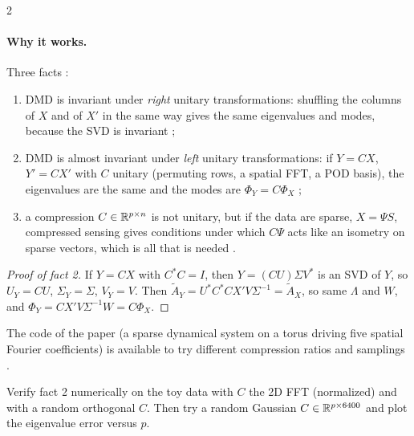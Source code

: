 \begin{paracol}{2}
\paragraph{Why it works.} Three facts :
\begin{enumerate}
  \item DMD is invariant under \emph{right} unitary transformations: shuffling the columns of $X$ and of
        $X'$ in the same way gives the same eigenvalues and modes, because the SVD is invariant
        ;
  \item DMD is almost invariant under \emph{left} unitary transformations: if $Y=CX$, $Y'=CX'$ with $C$
        unitary (permuting rows, a spatial FFT, a POD basis), the eigenvalues are the same and the modes are
        $\Phi_Y=C\Phi_X$ ;
  \item a compression $C\in\mathbb{R}^{p\times n}$ is not unitary, but if the data are sparse, $X=\Psi S$, compressed
        sensing gives conditions under which $C\Psi$ acts like an isometry on sparse vectors, which is
        all that is needed .
\end{enumerate}

\begin{proof}[Proof of fact 2]
If $Y=CX$ with $C^*C=I$, then $Y=(CU)\Sigma V^*$ is an SVD of $Y$, so $U_Y=CU$, $\Sigma_Y=\Sigma$, $V_Y=V$.
Then $\tilde A_Y=U^*C^*CX'V\Sigma^{-1}=\tilde A_X$, so same $\Lambda$ and $W$, and
$\Phi_Y=CX'V\Sigma^{-1}W=C\Phi_X$.
\end{proof}

The code of the paper (a sparse dynamical system on a torus driving five spatial Fourier coefficients) is
available to try different compression ratios and samplings .

\begin{exercise}
Verify fact 2 numerically on the toy data with $C$ the 2D FFT (normalized) and with a random orthogonal
$C$. Then try a random Gaussian $C\in\mathbb{R}^{p\times6400}$ and plot the eigenvalue error versus $p$.
\end{exercise}

\end{paracol}
